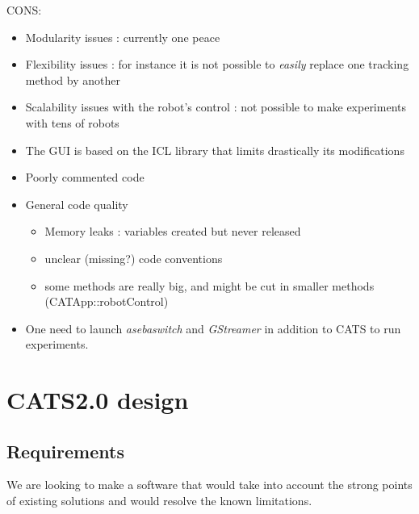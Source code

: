 \documentclass{styles/assisi}
\begin{document}
CONS:
\begin{itemize}
  \item Modularity issues : currently one peace
  \item Flexibility issues : for instance it is not possible to {\it easily} replace one tracking method by another
  \item Scalability issues with the robot's control : not possible to make experiments with tens of robots
  \item The GUI is based on the ICL library that limits drastically its modifications
  \item Poorly commented code
  \item General code quality
      \begin{itemize}
        \item{Memory leaks : variables created but never released}
        \item{unclear (missing?) code conventions}
        \item{some methods are really big, and might be cut in smaller methods (CATApp::robotControl) }
      \end{itemize}
  \item One need to launch {\it asebaswitch} and {\it GStreamer} in addition to CATS to run experiments.
\end{itemize}


\chapter{CATS2.0 design}\label{chap:cats2}

\section {Requirements}
We are looking to make a software that would take into account the strong points of existing solutions and would resolve the known limitations.
\end{document}
